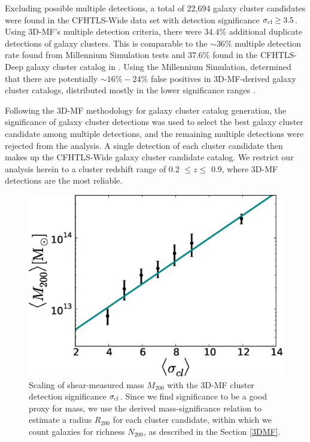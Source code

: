 Excluding possible multiple detections, a total of 22,694 galaxy cluster candidates were found in the \ac{CFHTLS}-Wide data set with detection significance $\sigma_{\rm cl} \ge 3.5$. Using \ac{3D-MF}'s multiple detection criteria, there were $34.4\%$ additional duplicate detections of galaxy clusters. This is comparable to the $\sim 36\%$ multiple detection rate found from Millennium Simulation tests and $37.6\%$ found in the \ac{CFHTLS}-Deep galaxy cluster catalog in \citet{Milkeraitis10}. Using the Millennium Simulation, \citet{Milkeraitis10} determined that there are potentially $\sim 16\%-24\%$ false positives in \ac{3D-MF}-derived galaxy cluster catalogs, distributed mostly in the lower significance ranges \citep[see Table~3 in][]{Milkeraitis10}.

Following the \ac{3D-MF} methodology for galaxy cluster catalog generation, the significance of galaxy cluster detections was used to select the best galaxy cluster candidate among multiple detections, and the remaining multiple detections were rejected from the analysis. A single detection of each cluster candidate then makes up the \ac{CFHTLS}-Wide galaxy cluster candidate catalog. We restrict our analysis herein to a cluster redshift range of 0.2 $\leq z \leq$ 0.9, where \ac{3D-MF} detections are the most reliable.

\begin{figure}
\begin{center}
  \includegraphics[scale=0.7]{plots_ch4/MassSig_relation.eps}
  \caption[Mass-Significance Relation]{Scaling of shear-measured mass $M_{200}$ with the \ac{3D-MF} cluster detection significance $\sigma_{\rm cl}$. Since we find significance to be a good proxy for mass, we use the derived mass-significance relation to estimate a radius $R_{200}$ for each cluster candidate, within which we count galaxies for richness $N_{200}$, as described in the Section \ref{3DMF}.}
\label{plot:masssig} %
\end{center}
\end{figure}

